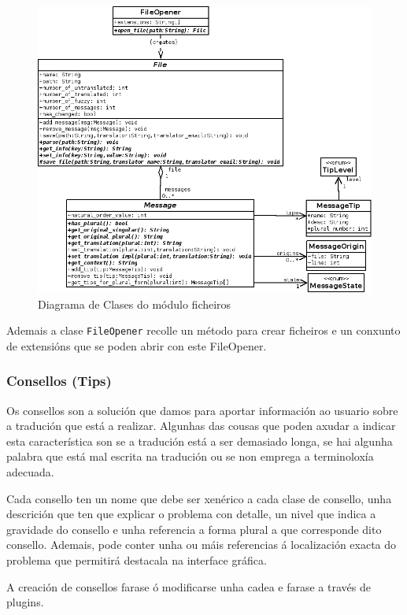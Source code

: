 \begin{figure}[h!]
    \centering
    \includegraphics[width=\textwidth]{img/genericfile.png}
    \caption{Diagrama de Clases do módulo ficheiros}
    \label{fig:dia_class:files}
\end{figure}

Ademais a clase \lstinline{FileOpener} recolle un método para crear ficheiros e un conxunto de extensións que se poden abrir con este FileOpener.

\subsubsection{Consellos (Tips)}
Os consellos son a solución que damos para aportar información ao usuario sobre a tradución que está a realizar. Algunhas das cousas que poden axudar a indicar esta característica son se a tradución está a ser demasiado longa, se hai algunha palabra que está mal escrita na tradución ou se non emprega a terminoloxía adecuada.

Cada consello ten un nome que debe ser xenérico a cada clase de consello, unha descrición que ten que explicar o problema con detalle, un nivel que indica a gravidade do consello e unha referencia a forma plural a que corresponde dito consello. Ademais, pode conter unha ou máis referencias á localización exacta do problema que permitirá destacala na interface gráfica.

A creación de consellos farase ó modificarse unha cadea e farase a través de plugins.

